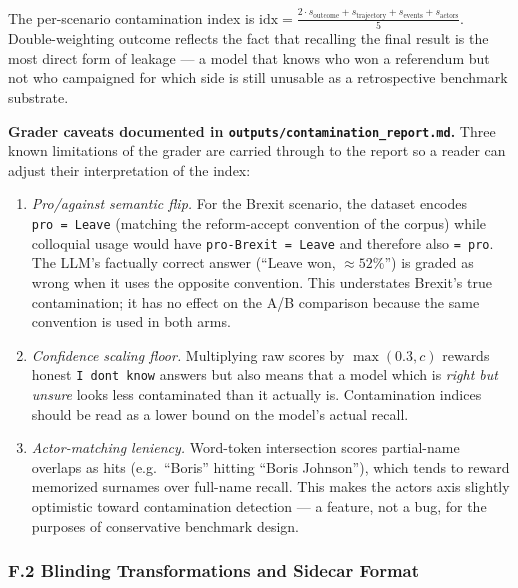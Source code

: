 \documentclass[
]{article}
\providecommand{\tightlist}{%
  \setlength{\itemsep}{0pt}\setlength{\parskip}{0pt}}
\begin{document}
The per-scenario contamination index is
\(\text{idx} = \frac{2 \cdot s_{\text{outcome}} + s_{\text{trajectory}} + s_{\text{events}} + s_{\text{actors}}}{5}\).
Double-weighting outcome reflects the fact that recalling the final
result is the most direct form of leakage --- a model that knows who won
a referendum but not who campaigned for which side is still unusable as
a retrospective benchmark substrate.

\textbf{Grader caveats documented in
\texttt{outputs/contamination\_report.md}.} Three known limitations of
the grader are carried through to the report so a reader can adjust
their interpretation of the index:

\begin{enumerate}
\def\labelenumi{\arabic{enumi}.}
\tightlist
\item
  \emph{Pro/against semantic flip.} For the Brexit scenario, the dataset
  encodes \texttt{pro\ =\ Leave} (matching the reform-accept convention
  of the corpus) while colloquial usage would have
  \texttt{pro-Brexit\ =\ Leave} and therefore also \texttt{=\ pro}. The
  LLM's factually correct answer (``Leave won, \(\approx 52\%\)'') is
  graded as wrong when it uses the opposite convention. This understates
  Brexit's true contamination; it has no effect on the A/B comparison
  because the same convention is used in both arms.
\item
  \emph{Confidence scaling floor.} Multiplying raw scores by
  \(\max(0.3, c)\) rewards honest
  \texttt{I\ don\textquotesingle{}t\ know} answers but also means that a
  model which is \emph{right but unsure} looks less contaminated than it
  actually is. Contamination indices should be read as a lower bound on
  the model's actual recall.
\item
  \emph{Actor-matching leniency.} Word-token intersection scores
  partial-name overlaps as hits (e.g.~``Boris'' hitting ``Boris
  Johnson''), which tends to reward memorized surnames over full-name
  recall. This makes the actors axis slightly optimistic toward
  contamination detection --- a feature, not a bug, for the purposes of
  conservative benchmark design.
\end{enumerate}

\subsubsection{F.2 Blinding Transformations and Sidecar
Format}\label{f.2-blinding-transformations-and-sidecar-format}
\end{document}
